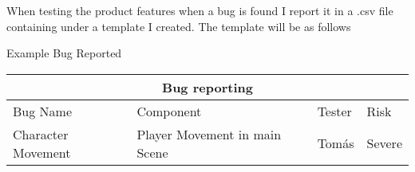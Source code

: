 When testing the product features when a bug is found I report it in a  .csv file containing under a template I created. The template will be as follows



\centerline{Example Bug Reported}

\setlength{\arrayrulewidth}{1mm}
\setlength{\tabcolsep}{18pt}
\renewcommand{\arraystretch}{2.5}

\begin{tabular}{ |p{2.5cm}|p{2.5cm}|p{2.5cm}||p{2.5cm}|  }
\hline
\multicolumn{4}{|c|}{Bug reporting  } \\
\hline
Bug Name      & Component  & Tester & Risk \\
\hline
Character Movement   & Player Movement in main Scene & Tomás & Severe \\
\hline

\end{tabular}

